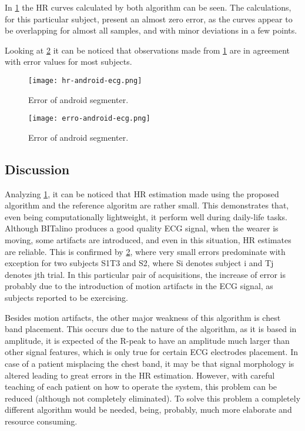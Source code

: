 In \cref{figure:hr_android} the HR curves calculated by both algorithm can be seen. The calculations, for this particular subject, present an almost zero error, as the curves appear to be overlapping for almost all samples, and with minor deviations in a few points.

Looking at \cref{figure:erro_android} it can be noticed that observations made from \cref{figure:hr_android} are in agreement with error values for most subjects.

\begin{figure}[!h]
	\centering
	\texttt{[image: hr-android-ecg.png]}
	\caption{Error of android segmenter.}
	\label{figure:hr_android}
\end{figure}

\begin{figure}[!h]
	\centering
	\texttt{[image: erro-android-ecg.png]}
	\caption{Error of android segmenter.}
	\label{figure:erro_android}
\end{figure}

\subsection{Discussion}

Analyzing \cref{figure:hr_android}, it can be noticed that HR estimation made using the proposed algorithm and the reference algoritm \cite{engzee} are rather small. This demonstrates that, even being computationally lightweight, it perform  well during daily-life tasks. Although BITalino produces a good quality ECG signal, when the wearer is moving, some artifacts are introduced, and even in this situation, HR estimates are reliable. This is confirmed by \cref{figure:erro_android}, where very small errors predominate with exception for two subjects S1T3 and S2, where Si denotes subject i and Tj denotes jth trial. In this particular pair of acquisitions, the increase of error is probably due to the introduction of motion artifacts in the ECG signal, as subjects reported to be exercising.

Besides motion artifacts, the other major weakness of this algorithm is chest band placement. This occurs due to the nature of the algorithm, as it is based in amplitude, it is expected of the R-peak to have an amplitude much larger than other signal features, which is only true for certain ECG electrodes placement. In case of a patient misplacing the chest band, it may be that signal morphology is altered leading to great errors in the HR estimation. However, with careful teaching of each patient on how to operate the system, this problem can be reduced (although not completely eliminated). To solve this problem a completely different algorithm would be needed, being, probably, much more elaborate and resource consuming.



